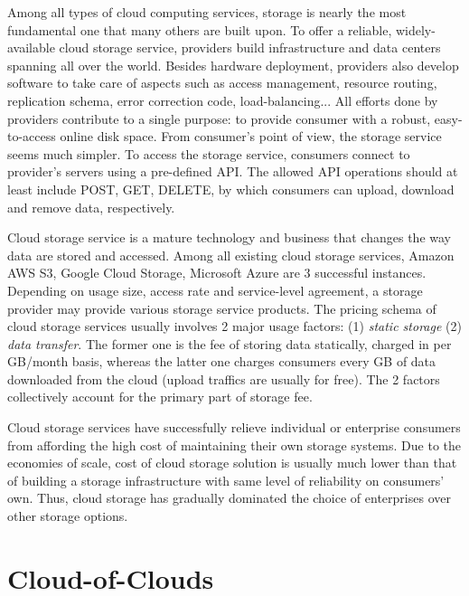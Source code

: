 Among all types of cloud computing services, storage is nearly the most fundamental one that many others are built upon. To offer a reliable, widely-available cloud storage service, providers build infrastructure and data centers spanning all over the world. Besides hardware deployment, providers also develop software to take care of aspects such as access management, resource routing, replication schema, error correction code, load-balancing... All efforts done by providers contribute to a single purpose: to provide consumer with a robust, easy-to-access online disk space. From consumer's point of view, the storage service seems much simpler. To access the storage service, consumers connect to provider's servers using a pre-defined API. The allowed API operations should at least include POST, GET, DELETE, by which consumers can upload, download and remove data, respectively.

Cloud storage service is a mature technology and business that changes the way data are stored and accessed. Among all existing cloud storage services, Amazon AWS S3\cite{awss3}, Google Cloud Storage\cite{googlecloudstorage}, Microsoft Azure\cite{msazurestorage} are 3 successful instances. Depending on usage size, access rate and service-level agreement, a storage provider may provide various storage service products. The pricing schema of cloud storage services usually involves 2 major usage factors: (1) \textit{static storage} (2) \textit{data transfer}. The former one is the fee of storing data statically, charged in per GB/month basis, whereas the latter one charges consumers every GB of data downloaded from the cloud (upload traffics are usually for free). The 2 factors collectively account for the primary part of storage fee.

Cloud storage services have successfully relieve individual or enterprise consumers from affording the high cost of maintaining their own storage systems. Due to the economies of scale, cost of cloud storage solution is usually much lower than that of building a storage infrastructure with same level of reliability on consumers' own. Thus, cloud storage has gradually dominated the choice of enterprises over other storage options\cite{storagetrends2018}.

\section{Cloud-of-Clouds}
\label{s:cloudofclouds}

